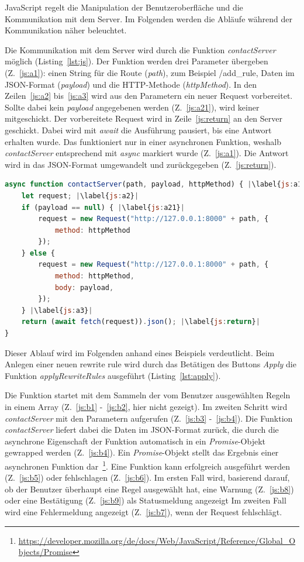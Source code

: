 JavaScript regelt die Manipulation der Benutzeroberfläche und die Kommunikation mit dem Server. Im Folgenden werden die Abläufe während der Kommunikation näher beleuchtet.

Die Kommunikation mit dem Server wird durch die Funktion \textit{contactServer} möglich (Listing~\ref{lst:js}).
Der Funktion werden drei Parameter übergeben (Z.~\ref{js:a1}): einen String für die Route (\textit{path}), zum Beispiel /add\_rule, Daten im JSON-Format (\textit{payload})
und die HTTP-Methode (\textit{httpMethod}). In den Zeilen~\ref{js:a2} bis~\ref{js:a3} wird aus den Parametern ein neuer Request vorbereitet. Sollte dabei kein \textit{payload}
angegebenen werden (Z.~\ref{js:a21}), wird keiner mitgeschickt. Der vorbereitete Request wird in Zeile~\ref{js:return} an den Server geschickt. Dabei wird mit \textit{await}
die Ausführung pausiert, bis eine Antwort erhalten wurde. Das funktioniert nur in einer asynchronen Funktion, weshalb \textit{contactServer} entsprechend mit \textit{async} 
markiert wurde (Z.~\ref{js:a1}). Die Antwort wird in das JSON-Format umgewandelt und zurückgegeben (Z.~\ref{js:return}).

\begin{lstlisting}[language=JavaScript, escapechar=|, caption=Auszug aus der Datei \textit{index.js}, label={lst:js}]
async function contactServer(path, payload, httpMethod) { |\label{js:a1}|
    let request; |\label{js:a2}|
    if (payload == null) { |\label{js:a21}|
        request = new Request("http://127.0.0.1:8000" + path, {
            method: httpMethod
        });
    } else {
        request = new Request("http://127.0.0.1:8000" + path, {
            method: httpMethod,
            body: payload,
        });
    } |\label{js:a3}|
    return (await fetch(request)).json(); |\label{js:return}|
}
\end{lstlisting} 

Dieser Ablauf wird im Folgenden anhand eines Beispiels verdeutlicht.
Beim Anlegen einer neuen rewrite rule wird durch das Betätigen des Buttons \textit{Apply} die Funktion \textit{applyRewriteRules} ausgeführt (Listing~\ref{lst:apply}).

Die Funktion startet mit dem Sammeln der vom Benutzer ausgewählten Regeln in einem Array (Z.~\ref{js:b1} -~\ref{js:b2}, hier nicht gezeigt).
Im zweiten Schritt wird \textit{contactServer} mit den Parametern aufgerufen (Z.~\ref{js:b3} -~\ref{js:b4}).
Die Funktion \textit{contactServer} liefert dabei die Daten im JSON-Format zurück, die durch die asynchrone Eigenschaft der Funktion automatisch in ein \textit{Promise}-Objekt gewrapped werden (Z.~\ref{js:b4}).
Ein \textit{Promise}-Objekt stellt das Ergebnis einer asynchronen Funktion dar~\footnote{\hspace{1.5mm}\url{https://developer.mozilla.org/de/docs/Web/JavaScript/Reference/Global_Objects/Promise}}.
Eine Funktion kann erfolgreich ausgeführt werden (Z.~\ref{js:b5}) oder fehlschlagen (Z.~\ref{js:b6}). Im ersten Fall wird, basierend darauf, ob der Benutzer überhaupt eine Regel ausgewählt hat,
eine Warnung (Z.~\ref{js:b8}) oder eine Bestätigung (Z.~\ref{js:b9}) als Statusmeldung angezeigt
Im zweiten Fall wird eine Fehlermeldung angezeigt (Z.~\ref{js:b7}), wenn der Request fehlschlägt.

